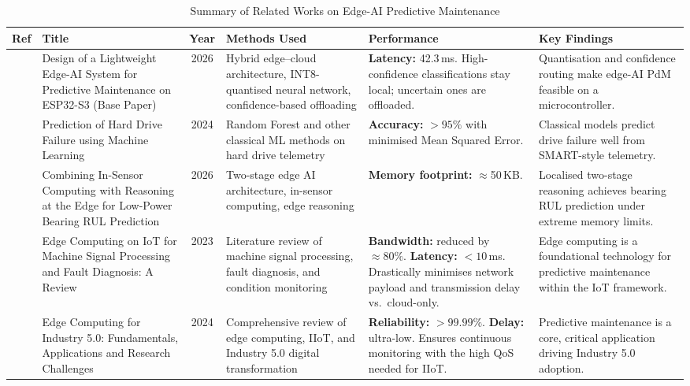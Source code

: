 \documentclass[12pt,a4paper]{report}
\begin{document}
\begin{table}[!htbp]
  \centering
  \caption{Summary of Related Works on Edge-AI Predictive Maintenance}
  \label{tab:lit1}
  \scriptsize
  \setlength{\tabcolsep}{3pt}
  \renewcommand{\arraystretch}{1.25}
  \begin{tabular}{|c|p{3.4cm}|c|p{3.0cm}|p{4.6cm}|p{3.9cm}|}
    \hline
    \textbf{Ref} & \textbf{Title} & \textbf{Year} & \textbf{Methods Used} & \textbf{Performance} & \textbf{Key Findings} \\ \hline
    [1] & Design of a Lightweight Edge-AI System for Predictive Maintenance on ESP32-S3 (Base Paper) & 2026 & Hybrid edge--cloud architecture, INT8-quantised neural network, confidence-based offloading & \textbf{Latency:} 42.3\,ms. High-confidence classifications stay local; uncertain ones are offloaded. & Quantisation and confidence routing make edge-AI PdM feasible on a microcontroller. \\ \hline
    [2] & Prediction of Hard Drive Failure using Machine Learning & 2024 & Random Forest and other classical ML methods on hard drive telemetry & \textbf{Accuracy:} $>95\%$ with minimised Mean Squared Error. & Classical models predict drive failure well from SMART-style telemetry. \\ \hline
    [3] & Combining In-Sensor Computing with Reasoning at the Edge for Low-Power Bearing RUL Prediction & 2026 & Two-stage edge AI architecture, in-sensor computing, edge reasoning & \textbf{Memory footprint:} $\approx$50\,KB. & Localised two-stage reasoning achieves bearing RUL prediction under extreme memory limits. \\ \hline
    [4] & Edge Computing on IoT for Machine Signal Processing and Fault Diagnosis: A Review & 2023 & Literature review of machine signal processing, fault diagnosis, and condition monitoring & \textbf{Bandwidth:} reduced by $\approx80\%$. \textbf{Latency:} $<10$\,ms. Drastically minimises network payload and transmission delay vs.\ cloud-only. & Edge computing is a foundational technology for predictive maintenance within the IoT framework. \\ \hline
    [5] & Edge Computing for Industry 5.0: Fundamentals, Applications and Research Challenges & 2024 & Comprehensive review of edge computing, IIoT, and Industry 5.0 digital transformation & \textbf{Reliability:} $>99.99\%$. \textbf{Delay:} ultra-low. Ensures continuous monitoring with the high QoS needed for IIoT. & Predictive maintenance is a core, critical application driving Industry 5.0 adoption. \\ \hline

\end{tabular}
\end{table}
\end{document}
